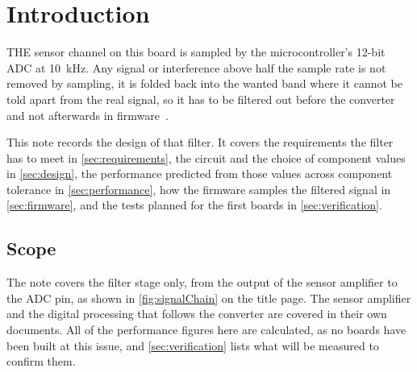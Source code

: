 
\section{Introduction}
\label{sec:introduction}

\lettrine[lines=2, slope=0em, loversize=0.14, nindent=0pt, lhang=0.3, lraise=0]{T}{HE}
sensor channel on this board is sampled by the microcontroller's 12-bit ADC at
\qty{10}{\kilo\hertz}. Any signal or interference above half the sample rate
is not removed by sampling, it is folded back into the wanted band where it
cannot be told apart from the real signal, so it has to be filtered out before
the converter and not afterwards in firmware~\cite{horowitz_hill_2015}.

This note records the design of that filter. It covers the requirements the
filter has to meet in \cref{sec:requirements}, the circuit and the choice of
component values in \cref{sec:design}, the performance predicted from those
values across component tolerance in \cref{sec:performance}, how the firmware
samples the filtered signal in \cref{sec:firmware}, and the tests planned for
the first boards in \cref{sec:verification}.

\subsection{Scope}

The note covers the filter stage only, from the output of the sensor amplifier
to the ADC pin, as shown in \cref{fig:signalChain} on the title page. The
sensor amplifier and the digital processing that follows the converter are
covered in their own documents. All of the performance figures here are
calculated, as no boards have been built at this issue, and
\cref{sec:verification} lists what will be measured to confirm them.
